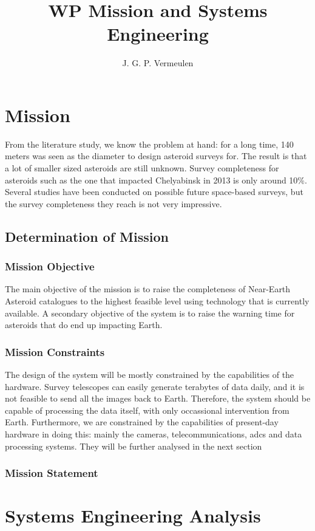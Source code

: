 \documentclass[a4paper,10pt]{article}
\title{WP Mission and Systems Engineering}
\author{J. G. P. Vermeulen}
\begin{document}
\maketitle

\section{Mission}
From the literature study, we know the problem at hand: for a long time, 140 meters was seen as the diameter to design asteroid surveys for. The result is that a lot of smaller sized asteroids are still unknown. Survey completeness for asteroids such as the one that impacted Chelyabinsk in 2013 is only around 10\%. Several studies have been conducted on possible future space-based surveys, but the survey completeness they reach is not very impressive. 
\subsection{Determination of Mission}
\subsubsection{Mission Objective}
The main objective of the mission is to raise the completeness of Near-Earth Asteroid catalogues to the highest feasible level using technology that is currently available. A secondary objective of the system is to raise the warning time for asteroids that do end up impacting Earth.
\subsubsection{Mission Constraints}
The design of the system will be mostly constrained by the capabilities of the hardware. Survey telescopes can easily generate terabytes of data daily, and it is not feasible to send all the images back to Earth. Therefore, the system should be capable of processing the data itself, with only occassional intervention from Earth. Furthermore, we are constrained by the capabilities of present-day hardware in doing this: mainly the cameras, telecommunications, adcs and data processing systems. They will be further analysed in the next section
\subsubsection{Mission Statement}


\section{Systems Engineering Analysis}
\end{document}
